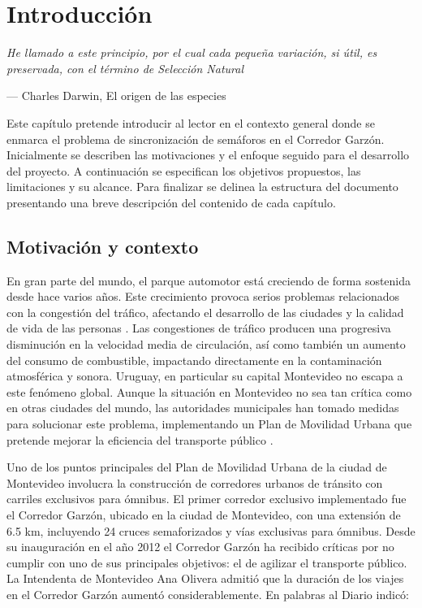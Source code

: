 \chapter{Introducción}
\epigraph{ \textit{He llamado a este principio, por el cual cada pequeña variación, si útil, es preservada, con el término de Selección Natural}}{--- Charles Darwin, El origen de las especies}

Este capítulo pretende introducir al lector en el contexto general donde se enmarca el problema de sincronización de semáforos en el Corredor Garzón. Inicialmente se describen las motivaciones y el enfoque seguido para el desarrollo del proyecto. A continuación se especifican los objetivos propuestos, las limitaciones y su alcance. Para finalizar se delinea la estructura del documento presentando una breve descripción del contenido de cada capítulo. 

\section{Motivación y contexto}

En gran parte del mundo, el parque automotor está creciendo de forma sostenida desde hace varios años. Este crecimiento provoca serios problemas relacionados con la congestión del tráfico, afectando el desarrollo de las ciudades y la calidad de vida de las personas \citep{Cepal2003}. Las congestiones de tráfico producen una progresiva disminución en la velocidad media de circulación, así como también un aumento del consumo de combustible, impactando directamente en la contaminación atmosférica y sonora. Uruguay, en particular su capital Montevideo no escapa a este fenómeno global. Aunque la situación en Montevideo no sea tan crítica como en otras ciudades del mundo, las autoridades municipales han tomado medidas para solucionar este problema, implementando un Plan de Movilidad Urbana que pretende mejorar la eficiencia del transporte público \citep{PlanMovilidad}.

Uno de los puntos principales del Plan de Movilidad Urbana de la ciudad de Montevideo involucra la construcción de corredores urbanos de tránsito con carriles exclusivos para ómnibus. El primer corredor exclusivo implementado fue el Corredor Garzón, ubicado en la ciudad de Montevideo, con una extensión de 6.5 km, incluyendo 24 cruces semaforizados y vías exclusivas para ómnibus. Desde su inauguración en el año 2012 el Corredor Garzón ha recibido críticas por no cumplir con uno de sus principales objetivos: el de agilizar el transporte público. La Intendenta de Montevideo Ana Olivera admitió que la duración de los viajes en el Corredor Garzón aumentó considerablemente. En palabras al Diario \cite{olivera2015} indicó: 


